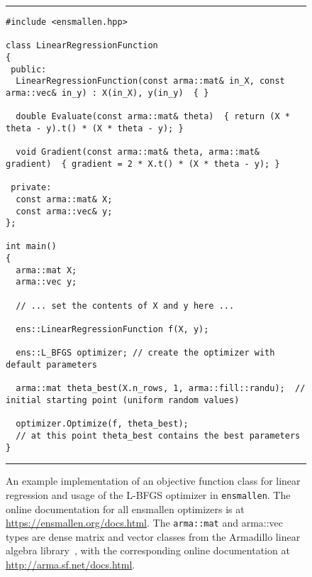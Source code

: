 \begin{figure}[t!]
\hrule
\vspace{1ex}
\centering
\begin{verbatim}
#include <ensmallen.hpp>

class LinearRegressionFunction
{
 public:
  LinearRegressionFunction(const arma::mat& in_X, const arma::vec& in_y) : X(in_X), y(in_y)  { }

  double Evaluate(const arma::mat& theta)  { return (X * theta - y).t() * (X * theta - y); }

  void Gradient(const arma::mat& theta, arma::mat& gradient)  { gradient = 2 * X.t() * (X * theta - y); }

 private:
  const arma::mat& X;
  const arma::vec& y;
};

int main()
{
  arma::mat X;
  arma::vec y;
  
  // ... set the contents of X and y here ...
  
  ens::LinearRegressionFunction f(X, y);

  ens::L_BFGS optimizer; // create the optimizer with default parameters

  arma::mat theta_best(X.n_rows, 1, arma::fill::randu);  // initial starting point (uniform random values)

  optimizer.Optimize(f, theta_best);
  // at this point theta_best contains the best parameters
}
\end{verbatim}
\hrule
\vspace*{-0.5em}
\caption{An example implementation of an objective function class for linear
regression and usage of the L-BFGS optimizer in {\tt ensmallen}.
The online documentation for all ensmallen optimizers
is at \mbox{\url{https://ensmallen.org/docs.html}}.
The {\tt arma::mat} and {arma::vec} types are 
dense matrix and vector classes
from the Armadillo linear algebra library~\cite{sanderson2016armadillo},
with the corresponding online documentation at \mbox{\url{http://arma.sf.net/docs.html}}.
}
\label{fig:lr_function}
\end{figure}
